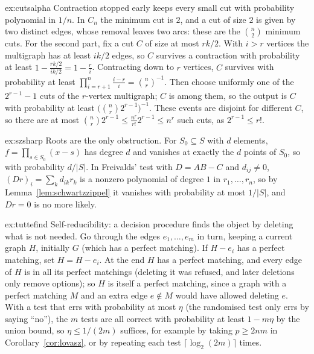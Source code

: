 \begin{solution}{ex:cutsalpha}
\idea Contraction stopped early keeps every small cut with probability polynomial in $1/n$.
\writeup In $C_n$ the minimum cut is $2$, and a cut of size $2$ is given by two distinct edges, whose removal leaves two arcs: these are the $\binom n2$ minimum cuts. For the second part, fix a cut $C$ of size at most $rk/2$. With $i>r$ vertices the multigraph has at least $ik/2$ edges, so $C$ survives
a contraction with probability at least $1-\frac{rk/2}{ik/2}=1-\frac ri$. Contracting down to $r$ vertices, $C$ survives with probability at least $\prod_{i=r+1}^n\frac{i-r}i=\binom nr^{-1}$. Then choose uniformly one of the $2^{r-1}-1$ cuts of the $r$-vertex multigraph; $C$ is among them, so the output is $C$ with probability at least
$\bigl(\binom nr2^{r-1}\bigr)^{-1}$. These events are disjoint for different $C$, so there are at most $\binom nr2^{r-1}\le\frac{n^r}{r!}2^{r-1}\le n^r$ such cuts, as $2^{r-1}\le r!$.
\end{solution}

\begin{solution}{ex:szsharp}
\idea Roots are the only obstruction.
\writeup For $S_0\subseteq S$ with $d$ elements, $f=\prod_{s\in S_0}(x-s)$ has degree $d$ and vanishes at exactly the $d$ points of $S_0$, so with probability $d/|S|$. In Freivalds' test with $D=AB-C$ and $d_{ij}\ne0$, $(Dr)_i=\sum_kd_{ik}r_k$ is a nonzero polynomial of degree $1$ in $r_1,\dots,r_n$, so by
Lemma~\ref{lem:schwartzzippel} it vanishes with probability at most $1/|S|$, and $Dr=0$ is no more likely.
\end{solution}

\begin{solution}{ex:tuttefind}
\idea Self-reducibility: a decision procedure finds the object by deleting what is not needed.
\writeup Go through the edges $e_1,\dots,e_m$ in turn, keeping a current graph $H$, initially $G$ (which has a perfect matching). If $H-e_i$ has a perfect matching, set $H=H-e_i$. At the end $H$ has a perfect matching, and every edge of $H$ is in all its perfect matchings (deleting it was refused, and later deletions only remove options); so $H$ is itself a
perfect matching, since a graph with a perfect matching $M$ and an extra edge $e\notin M$ would have allowed deleting $e$. With a test that errs with probability at most $\eta$ (the randomised test only errs by saying ``no''), the $m$ tests are all correct with probability at least $1-m\eta$ by the union bound, so $\eta\le1/(2m)$ suffices, for example
by taking $p\ge2nm$ in Corollary~\ref{cor:lovasz}, or by repeating each test $\lceil\log_2(2m)\rceil$ times.
\end{solution}

